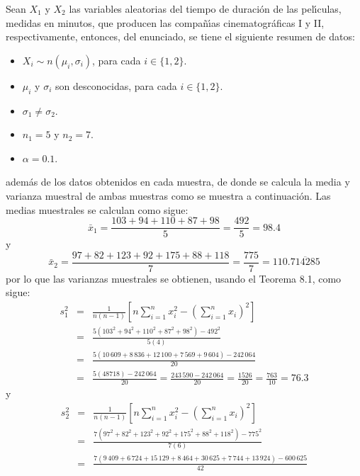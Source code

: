 \begin{solucion}
 Sean $X_1$ y $X_2$ las variables aleatorias del tiempo de duraci\'on de las pel\'{\i}culas, medidas en minutos, que producen las compa\~n\'{\i}as cinematogr\'aficas I y II, respectivamente, entonces, del enunciado, se tiene el siguiente resumen de datos:
 \begin{itemize}
  \item $X_i \sim n(\mu_i, \sigma_i)$, para cada $i \in \{ 1, 2 \}$.
  \item $\mu_i$ y $\sigma_i$ son desconocidas, para cada $i \in \{ 1, 2 \}$.
  \item $\sigma_1 \neq \sigma_2$.
  \item $n_1 = 5$ y $n_2 = 7$.
  \item $\alpha = 0.1$.
 \end{itemize}
 adem\'as de los datos obtenidos en cada muestra, de donde se calcula la media y varianza muestral de ambas muestras como se muestra a continuaci\'on. Las medias muestrales se calculan como sigue:
 \begin{equation*}
  \bar{x}_1 = \frac{103 + 94 + 110 + 87 + 98}{5} = \frac{492}{5} = 98.4
 \end{equation*}
 y
 \begin{equation*}
  \bar{x}_2 = \frac{97 + 82 + 123 + 92 + 175 + 88 + 118}{7} = \frac{775}{7} = 110.\overline{714285}
 \end{equation*}
 por lo que las varianzas muestrales se obtienen, usando el Teorema 8.1, como sigue:
 \begin{eqnarray*}
  s_1^2 & = & \frac{1}{n(n-1)} \left[ n \sum_{i=1}^n x_i^2 - \left( \sum_{i=1}^n x_i \right)^2 \right] \\
  & = & \frac{5(103^2 + 94^2 + 110^2 + 87^2 + 98^2) - 492^2}{5(4)} \\
  & = & \frac{5(10\,609 + 8\,836 + 12\,100 + 7\,569 + 9\,604) - 242\,064}{20} \\
  & = & \frac{5(48718) - 242\,064}{20} = \frac{243\,590 - 242\,064}{20} = \frac{1526}{20} = \frac{763}{10} = 76.3
 \end{eqnarray*}
 y
 \begin{eqnarray*}
  s_2^2 & = & \frac{1}{n(n-1)} \left[ n \sum_{i=1}^n x_i^2 - \left( \sum_{i=1}^n x_i \right)^2 \right] \\
  & = & \frac{7(97^2 + 82^2 + 123^2 + 92^2 + 175^2 + 88^2 + 118^2) - 775^2}{7(6)} \\
  & = & \frac{7(9\,409 + 6\,724 + 15\,129 + 8\,464 + 30\,625 + 7\,744 + 13\,924) - 600\,625}{42} \\

\end{eqnarray*}
\end{solucion}
